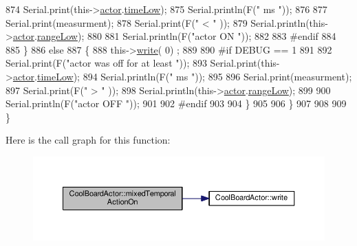 \begin{DoxyCode}
874             Serial.print(this->\hyperlink{class_cool_board_actor_a8f190db9f7a39fddbcef7f152da970e9}{actor}.\hyperlink{struct_cool_board_actor_1_1state_a314c53c146e8c7b12c025323a34fbb9a}{timeLow});
875             Serial.println(F(\textcolor{stringliteral}{" ms "}));
876 
877             Serial.print(measurment);
878             Serial.print(F(\textcolor{stringliteral}{" < "} ));
879             Serial.println(this->\hyperlink{class_cool_board_actor_a8f190db9f7a39fddbcef7f152da970e9}{actor}.\hyperlink{struct_cool_board_actor_1_1state_a43f891c9fb3bb63575c27cec860de55a}{rangeLow});
880     
881             Serial.println(F(\textcolor{stringliteral}{"actor ON "}));
882     
883 \textcolor{preprocessor}{        #endif  }
884 
885         \}
886         \textcolor{keywordflow}{else} 
887         \{
888             this->\hyperlink{class_cool_board_actor_a958786ff01ea1056ee72c72d439f86da}{write}( 0) ;  
889 
890 \textcolor{preprocessor}{        #if DEBUG == 1 }
891 
892             Serial.print(F(\textcolor{stringliteral}{"actor was off for at least "}));
893             Serial.print(this->\hyperlink{class_cool_board_actor_a8f190db9f7a39fddbcef7f152da970e9}{actor}.\hyperlink{struct_cool_board_actor_1_1state_a314c53c146e8c7b12c025323a34fbb9a}{timeLow});
894             Serial.println(F(\textcolor{stringliteral}{" ms "}));
895 
896             Serial.print(measurment);
897             Serial.print(F(\textcolor{stringliteral}{" > "} ));
898             Serial.println(this->\hyperlink{class_cool_board_actor_a8f190db9f7a39fddbcef7f152da970e9}{actor}.\hyperlink{struct_cool_board_actor_1_1state_a43f891c9fb3bb63575c27cec860de55a}{rangeLow});
899 
900             Serial.println(F(\textcolor{stringliteral}{"actor OFF "}));
901     
902 \textcolor{preprocessor}{        #endif              }
903 
904         \}
905 
906     \}
907 
908     
909 \}
\end{DoxyCode}
Here is the call graph for this function\+:\nopagebreak
\begin{figure}[H]
\begin{center}
\leavevmode
\includegraphics[width=350pt]{dc/d69/class_cool_board_actor_a216aa7a0cfd1f31d0025cc91c2ecd5dd_cgraph}
\end{center}
\end{figure}
